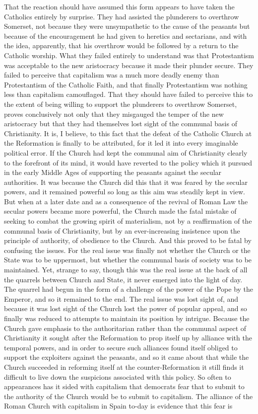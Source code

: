 \documentclass{book}
\begin{document}
That the reaction should have assumed this form appears to have taken the Catholics entirely by surprise. They had assisted the plunderers to overthrow Somerset, not because they were unsympathetic to the cause of the peasants but because of the encouragement he had given to heretics and sectarians, and with the idea, apparently, that his overthrow would be followed by a return to the Catholic worship. What they failed entirely to understand was that Protestantism was acceptable to the new aristocracy because it made their plunder secure. They failed to perceive that capitalism was a much more deadly enemy than Protestantism of the Catholic Faith, and that finally Protestantism was nothing less than capitalism camouflaged. That they should have failed to perceive this to the extent of being willing to support the plunderers to overthrow Somerset, proves conclusively not only that they misgauged the temper of the new aristocracy but that they had themselves lost sight of the communal basis of Christianity. It is, I believe, to this fact that the defeat of the Catholic Church at the Reformation is finally to be attributed, for it led it into every imaginable political error. If the Church had kept the communal aim of Christianity clearly to the forefront of its mind, it would have reverted to the policy which it pursued in the early Middle Ages of supporting the peasants against the secular authorities. It was because the Church did this that it was feared by the secular powers, and it remained powerful so long as this aim was steadily kept in view. But when at a later date and as a consequence of the revival of Roman Law the secular powers became more powerful, the Church made the fatal mistake of seeking to combat the growing spirit of materialism, not by a reaffirmation of the communal basis of Christianity, but by an ever-increasing insistence upon the principle of authority, of obedience to the Church. And this proved to be fatal by confusing the issues. For the real issue was finally not whether the Church or the State was to be uppermost, but whether the communal basis of society was to be maintained. Yet, strange to say, though this was the real issue at the back of all the quarrels between Church and State, it never emerged into the light of day. The quarrel had begun in the form of a challenge of the power of the Pope by the Emperor, and so it remained to the end. The real issue was lost sight of, and because it was lost sight of the Church lost the power of popular appeal, and so finally was reduced to attempts to maintain its position by intrigue. Because the Church gave emphasis to the authoritarian rather than the communal aspect of Christianity it sought after the Reformation to prop itself up by alliance with the temporal powers, and in order to secure such alliances found itself obliged to support the exploiters against the peasants, and so it came about that while the Church succeeded in reforming itself at the counter-Reformation it still finds it difficult to live down the suspicions associated with this policy. So often to appearances has it sided with capitalism that democrats fear that to submit to the authority of the Church would be to submit to capitalism. The alliance of the Roman Church with capitalism in Spain to-day is evidence that this fear is 
\end{document}
